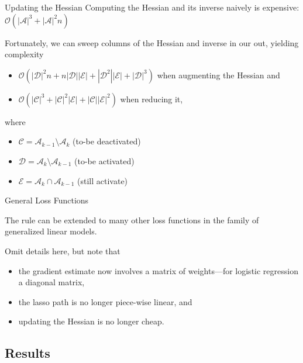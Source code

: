 \begin{frame}{Updating the Hessian}
  Computing the Hessian and its inverse naively is expensive:
  \(\mathcal{O}(|\mathcal{A}|^3 + |\mathcal{A}|^2n)\)

  \medskip

  Fortunately, we can sweep columns of the Hessian and inverse in our out,
  yielding complexity
  \begin{itemize}
    \item \(\mathcal{O}(|\mathcal{D}|^2n + n|\mathcal{D}||\mathcal{E}| +
          |\mathcal{D}^2||\mathcal{E}| + |\mathcal{D}|^3)\) when
          augmenting the Hessian and
    \item \(\mathcal{O}(|\mathcal{C}|^3 + |\mathcal{C}|^2|\mathcal{E}| +
          |\mathcal{C}||\mathcal{E}|^2)\) when reducing it,
  \end{itemize}
  where 
  \begin{itemize}
    \item \(\mathcal{C} = \mathcal{A}_{k-1} \setminus \mathcal{A}_k\) 
      (to-be deactivated)
    \item \(\mathcal{D} = \mathcal{A}_k \setminus \mathcal{A}_{k-1}\)
      (to-be activated)
    \item \(\mathcal{E} = \mathcal{A}_k \cap \mathcal{A}_{k-1}\)
      (still activate)
  \end{itemize}
\end{frame}

\begin{frame}{General Loss Functions}

  The rule can be extended to many other loss functions in the family of
  generalized linear models.

  \medskip

  Omit details here, but note that
  \begin{itemize}
    \item the gradient estimate now involves a matrix of weights---for logistic
      regression a diagonal matrix,
    \item the lasso path is no longer piece-wise linear, and
    \item updating the Hessian is no longer cheap.
  \end{itemize}
\end{frame}

\subsection{Results}

